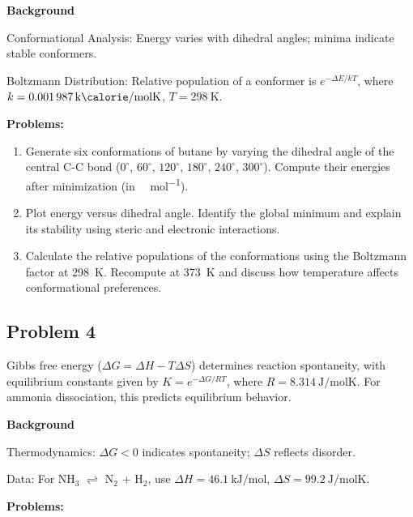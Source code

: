\documentclass[12pt]{article}
\begin{document}
\textbf{Background}

Conformational Analysis: Energy varies with dihedral angles; minima indicate stable conformers.

Boltzmann Distribution: Relative population of a conformer is $e^{-\Delta E / kT}$, where $k = \SI{0.001987}{\kilo\calorie\per\mole\kelvin}$, $T = \SI{298}{\kelvin}$.

\textbf{Problems:}

\begin{enumerate}
\item Generate six conformations of butane by varying the dihedral angle of the central C-C bond ($0^\circ$, $60^\circ$, $120^\circ$, $180^\circ$, $240^\circ$, $300^\circ$). Compute their energies after minimization (in \si{\kilo\calorie\per\mole}).

\item Plot energy versus dihedral angle. Identify the global minimum and explain its stability using steric and electronic interactions.

\item Calculate the relative populations of the conformations using the Boltzmann factor at \SI{298}{\kelvin}. Recompute at \SI{373}{\kelvin} and discuss how temperature affects conformational preferences.
\end{enumerate}

\newpage
\subsection{Problem 4}
Gibbs free energy ($\Delta G = \Delta H - T\Delta S$) determines reaction spontaneity, with equilibrium constants given by $K = e^{-\Delta G / RT}$, where $R = \SI{8.314}{\joule\per\mole\kelvin}$. For ammonia dissociation, this predicts equilibrium behavior.

\textbf{Background}

Thermodynamics: $\Delta G < 0$ indicates spontaneity; $\Delta S$ reflects disorder.

Data: For NH$_3$ $\rightleftharpoons$ N$_2$ + H$_2$, use $\Delta H = \SI{46.1}{\kilo\joule\per\mole}$, $\Delta S = \SI{99.2}{\joule\per\mole\kelvin}$.

\textbf{Problems:}
\end{document}
